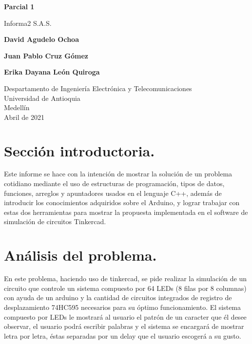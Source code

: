 \documentclass{article}
\begin{document}
\begin{titlepage}
    \begin{center}
        \vspace*{0cm}
            
        \Huge
        \textbf{Parcial 1}
            
        \vspace{0.5cm}
        \LARGE
        Informa2 S.A.S.
            
        \vspace{5cm}
            
        \textbf{David Agudelo Ochoa}
        
        \vspace{0.5cm}
        
        \textbf{Juan Pablo Cruz Gómez}
        
        \vspace{0.5cm}
        
        \textbf{Erika Dayana León Quiroga}
            
        \vfill
            
        \vspace{0.8cm}
            
        \Large
        Despartamento de Ingeniería Electrónica y Telecomunicaciones\\
        Universidad de Antioquia\\
        Medellín\\
        Abril de 2021
            
    \end{center}
\end{titlepage}

\tableofcontents
\newpage
\section{Sección introductoria.}\label{intro}
Este informe se hace con la intención de mostrar la solución de un problema cotidiano mediante el uso de  estructuras de programación, tipos de datos, funciones, arreglos y apuntadores usados en el lenguaje C++, además de introducir los conocimientos adquiridos sobre el Arduino, y lograr trabajar con estas dos herramientas para mostrar la propuesta implementada en el software de simulación de circuitos Tinkercad.

\section{Análisis del problema.} \label{contenido}
En este problema, haciendo uso de tinkercad, se pide realizar la simulación de un circuito que controle un sistema compuesto por 64 LEDs (8 filas por 8 columnas) con ayuda de un arduino y la cantidad de circuitos integrados de registro de desplazamiento 74HC595 necesarios para su óptimo funcionamiento. El sistema compuesto por LEDs le mostrará al usuario el patrón de un caracter que él desee observar, el usuario podrá escribir palabras y el sistema se encargará de mostrar letra por letra, éstas separadas por un delay que el usuario escogerá a su gusto.
\end{document}
